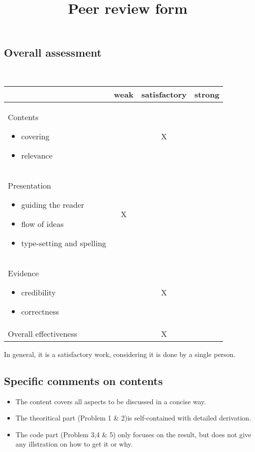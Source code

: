 \documentclass[11pt]{amsart}
\title{Peer review form}
\begin{document}
\maketitle


\subsection*{Overall assessment}
\ \bigskip


\begin{center}
  \begin{tabular}{|p{5cm}|c|c|c|} 
     \hline
     & weak & satisfactory & strong \\ \hline 
     Contents {\footnotesize \begin{itemize} \item covering \item relevance \end{itemize}} & &X & \\ \hline 
     Presentation {\footnotesize \begin{itemize} \item guiding the reader \item flow of ideas \item type-setting and spelling \end{itemize}} & X& & \\ \hline 
     Evidence {\footnotesize \begin{itemize} \item credibility \item correctness \end{itemize}} & &X & \\ \hline 
     Overall effectiveness & &X & \\ \hline 
  \end{tabular}
\end{center}

In general, it is a satisfactory work, considering it is done by a single person.
\subsection*{Specific comments on contents}


\begin{itemize}
	\item The content covers all aspects to be discussed in a concise way.
	\item The theoritical part (Problem 1 \& 2)is self-contained with detailed derivation.
	\item The code part (Problem 3,4 \& 5) only focuses on the result, but does not give any illstration on how to get it or why.
\end{itemize}
\end{document}
